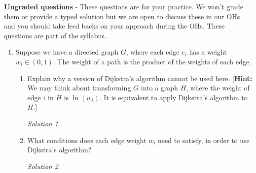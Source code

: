 \documentclass[12pt]{article}
\theoremstyle{remark}
\newtheorem*{solution}{Solution}
\begin{document}
\pagebreak
\textbf{Ungraded questions} - These questions are for your practice. We won't grade them or provide a typed solution but we are open to discuss these in our OHs and you should take feed backs on your approach during the OHs. These questions are part of the syllabus. 

\begin{enumerate}

\item Suppose we have a directed graph $G$, where each edge $e_{i}$ has a weight $w_{i} \in (0, 1).$  The weight of a path is the product of the weights of each edge. 
\begin{enumerate}[label=(\alph*)]
\item Explain why a version of Dijkstra's algorithm cannot be used here. [\textbf{Hint:} We may think about transforming $G$ into a graph $H$, where the weight of edge $i$ in $H$ is $\ln(w_{i})$. It is equivalent to apply Dijkstra's algorithm to $H$.]
\begin{solution}

\end{solution}

\item What conditions does each edge weight $w_{i}$ need to satisfy, in order to use Dijkstra's algorithm?
\begin{solution}

\end{solution}


\end{enumerate}



\end{enumerate}
\end{document}

